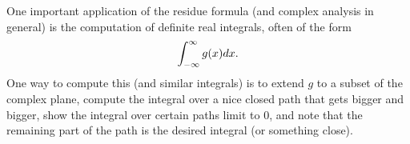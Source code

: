 One important application of the residue formula (and complex analysis in general) is the computation of definite real integrals, often of the form
\[
    \int_{-\infty}^\infty g(x)dx.
\]
One way to compute this (and similar integrals) is to extend $g$ to a subset of the complex plane, compute the integral over a nice closed path that gets bigger and bigger, show the integral over certain paths limit to 0, and note that the remaining part of the path is the desired integral (or something close).

